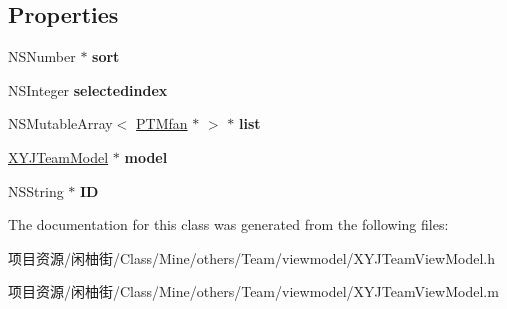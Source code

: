 \subsection*{Properties}
\begin{DoxyCompactItemize}
\item 
\mbox{\label{interface_x_y_j_team_view_model_a309099964dd074bce363aa29810653de}} 
N\+S\+Number $\ast$ {\bfseries sort}
\item 
\mbox{\label{interface_x_y_j_team_view_model_a3de419833f119cce2467891ee30f9718}} 
N\+S\+Integer {\bfseries selectedindex}
\item 
\mbox{\label{interface_x_y_j_team_view_model_a53f363fff4cd0b084639a9ee2c85fdb6}} 
N\+S\+Mutable\+Array$<$ \mbox{\hyperlink{interface_p_t_mfan}{P\+T\+Mfan}} $\ast$ $>$ $\ast$ {\bfseries list}
\item 
\mbox{\label{interface_x_y_j_team_view_model_acd2ab80a399f5ac8002b222070b44cfe}} 
\mbox{\hyperlink{interface_x_y_j_team_model}{X\+Y\+J\+Team\+Model}} $\ast$ {\bfseries model}
\item 
\mbox{\label{interface_x_y_j_team_view_model_ab5ac21484e33446e5557cfecbe7b942e}} 
N\+S\+String $\ast$ {\bfseries ID}
\end{DoxyCompactItemize}


The documentation for this class was generated from the following files\+:\begin{DoxyCompactItemize}
\item 
项目资源/闲柚街/\+Class/\+Mine/others/\+Team/viewmodel/X\+Y\+J\+Team\+View\+Model.\+h\item 
项目资源/闲柚街/\+Class/\+Mine/others/\+Team/viewmodel/X\+Y\+J\+Team\+View\+Model.\+m\end{DoxyCompactItemize}
